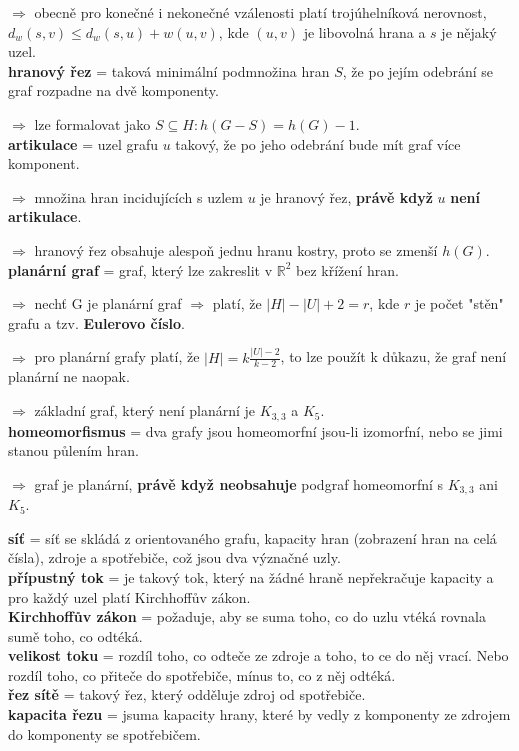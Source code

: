 \documentclass[12pt]{article}
\begin{document}
$\Rightarrow$ obecně pro konečné i nekonečné vzálenosti platí trojúhelníková nerovnost, $d_w(s, v) \leq d_w(s, u) + w(u, v)$, kde $(u, v)$ je libovolná hrana a $s$ je nějaký uzel.\\

\noindent
\textbf{hranový řez} = taková minimální podmnožina hran $S$, že po jejím odebrání se graf rozpadne na dvě komponenty.

$\Rightarrow$ lze formalovat jako $S \subseteq H: h(G-S) = h(G)-1$.\\
\textbf{artikulace} = uzel grafu $u$ takový, že po jeho odebrání bude mít graf více komponent.

$\Rightarrow$ množina hran incidujících s uzlem $u$ je hranový řez, \textbf{právě když} $u$ \textbf{není artikulace}.

$\Rightarrow$ hranový řez obsahuje alespoň jednu hranu kostry, proto se zmenší $h(G)$.\\


\noindent
\textbf{planární graf} = graf, který lze zakreslit v $\mathbb{R}^2$ bez křížení hran.

$\Rightarrow$ nechť G je planární graf $\Rightarrow$ platí, že $\left|H\right| - \left|U\right| + 2 = r$, kde $r$ je počet "stěn" grafu a tzv. \textbf{Eulerovo číslo}.

$\Rightarrow$ pro planární grafy platí, že $\left|H\right|=k \frac{\left|U\right|-2}{k-2}$, to lze použít k důkazu, že graf není planární ne naopak.

$\Rightarrow$ základní graf, který není planární je $K_{3,3}$ a $K_5$.\\
\textbf{homeomorfismus} = dva grafy jsou homeomorfní jsou-li izomorfní, nebo se jimi stanou půlením hran.

$\Rightarrow$ graf je planární, \textbf{právě když neobsahuje} podgraf homeomorfní s $K_{3,3}$ ani $K_5$.


\noindent
\textbf{síť} = síť se skládá z orientovaného grafu, kapacity hran (zobrazení hran na celá čísla), zdroje a spotřebiče, což jsou dva význačné uzly.\\
\textbf{přípustný tok} = je takový tok, který na žádné hraně nepřekračuje kapacity a pro každý uzel platí Kirchhoffův zákon.\\
\textbf{Kirchhoffův zákon} = požaduje, aby se suma toho, co do uzlu vtéká rovnala sumě toho, co odtéká.\\
\textbf{velikost toku} = rozdíl toho, co odteče ze zdroje a toho, to ce do něj vrací. Nebo rozdíl toho, co přiteče do spotřebiče, mínus to, co z něj odtéká.\\
\textbf{řez sítě} = takový řez, který odděluje zdroj od spotřebiče.\\
\textbf{kapacita řezu} = jsuma kapacity hrany, které by vedly z komponenty ze zdrojem do komponenty se spotřebičem.
\end{document}
